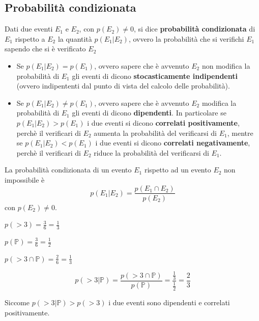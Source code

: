 \documentclass{article}     %
\begin{document}
            \subsection{Probabilità condizionata}
                \begin{boxdef}
                    Dati due eventi $E_1$ e $E_2$, con $p(E_2)\neq 0$, si dice \textbf{probabilità condizionata} di $E_1$ rispetto a $E_2$ la quantità $p(E_1|E_2)$, ovvero la probabilità che si verifichi $E_1$ sapendo che si è verificato $E_2$
                \end{boxdef}
                \begin{itemize}
                    \item Se $p(E_1|E_2)=p(E_1)$, ovvero sapere che è avvenuto $E_2$ non modifica la probabilità di $E_1$ gli eventi di dicono \textbf{stocasticamente indipendenti} (ovvero indipententi dal punto di vista del calcolo delle probabilità).
                    \item Se $p(E_1|E_2)\neq p(E_1)$, ovvero sapere che è avvenuto $E_2$ modifica la probabilità di $E_1$ gli eventi di dicono \textbf{dipendenti}. In particolare se $p(E_1|E_2) > p(E_1)$ i due eventi si dicono \textbf{correlati positivamente}, perchè il verificari di $E_2$ aumenta la probabilità del verificarsi di $E_1$, mentre se $p(E_1|E_2)< p(E_1)$ i due eventi si dicono \textbf{correlati negativamente}, perchè il verificari di $E_2$ riduce la probabilità del verificarsi di $E_1$.
                \end{itemize}
                 
                \begin{shadedTheorem}
                    La probabilità condizionata di un evento $E_1$ rispetto ad un evento $E_2$ non impossibile è \[p(E_1|E_2)=\frac{p(E_1\cap E_2)}{p(E_2)}\]
                    con $p(E_2)\neq 0$.
                \end{shadedTheorem}

                \begin{ex}
                
                $p(>3)=\frac{3}{6}=\frac{1}{3}$

                $p(\mathbb{P})=\frac{3}{6}=\frac{1}{2}$

                $p(>3\cap\mathbb{P})=\frac{2}{6}=\frac{1}{3}$

                \[p(>3|\mathbb{P})=\frac{p(>3\cap\mathbb{P})}{p(\mathbb{P})}=\frac{\frac{1}{3}}{\frac{1}{2}}=\frac{2}{3}\]

                Siccome $p(>3|\mathbb{P})>p(>3)$ i due eventi sono dipendenti e correlati positivamente.
            \end{ex}
\end{document}

